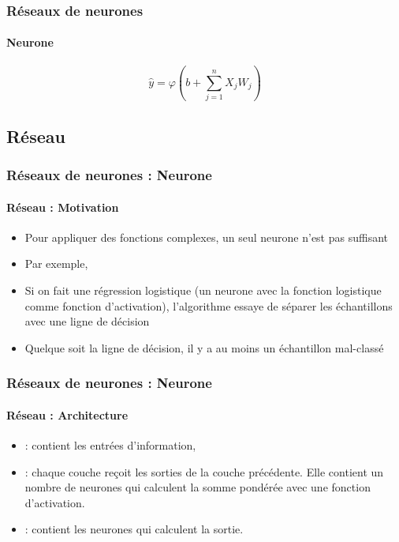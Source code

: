 \documentclass[xcolor=table]{beamer}
\begin{document}
\begin{frame}
\frametitle{Réseaux de neurones}
\framesubtitle{Neurone}

\begin{center}
\end{center}

\[\hat{y} = \varphi (b + \sum_{j=1}^n X_j W_j)\]

\end{frame}

\subsection{Réseau}

\begin{frame}
\frametitle{Réseaux de neurones : Neurone}
\framesubtitle{Réseau : Motivation}

\begin{minipage}{0.59\textwidth}
\begin{itemize}
	\item Pour appliquer des fonctions complexes, un seul neurone n'est pas suffisant
	\item Par exemple, 
	\item Si on fait une régression logistique (un neurone avec la fonction logistique comme fonction d'activation), l'algorithme essaye de séparer les échantillons avec une ligne de décision
	\item Quelque soit la ligne de décision, il y a au moins un échantillon mal-classé
\end{itemize}
\end{minipage}
\begin{minipage}{0.4\textwidth}
\end{minipage}

\end{frame}

\begin{frame}
\frametitle{Réseaux de neurones : Neurone}
\framesubtitle{Réseau : Architecture}

\begin{minipage}{0.59\textwidth}
	\begin{itemize}
		\item {} : contient les entrées d'information,  
		\item {} : chaque couche reçoit les sorties de la couche précédente. 
		Elle contient un nombre de neurones qui calculent la somme pondérée avec une fonction d'activation. 
		\item {} : contient les neurones qui calculent la sortie. 
	\end{itemize}
\end{minipage}
\begin{minipage}{0.4\textwidth}
\end{minipage}

\end{frame}
\end{document}
